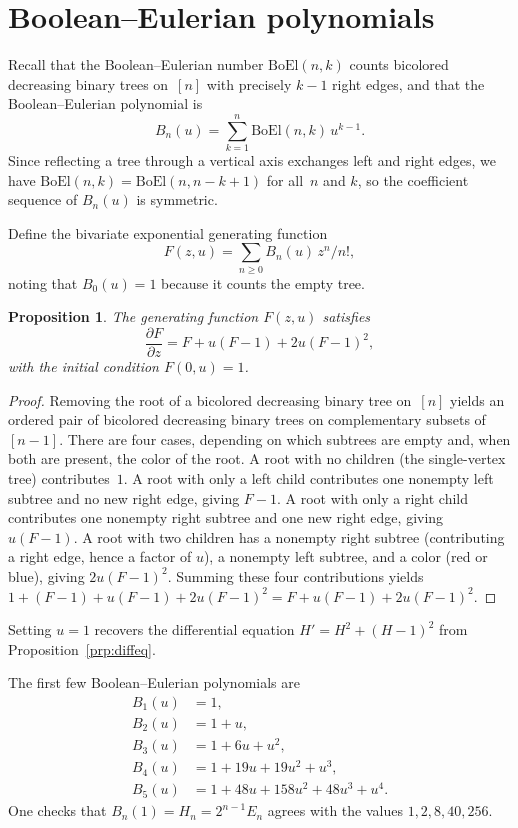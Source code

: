 \documentclass[10pt]{article}
\theoremstyle{plain}
\newtheorem{proposition}[theorem]{Proposition}
\newcommand{\boel}{\mathrm{BoEl}}
\begin{document}
\section{Boolean--Eulerian polynomials}
\label{sec:polynomials}

Recall that the Boolean--Eulerian number $\boel(n,k)$ counts bicolored decreasing binary trees on~$[n]$ with precisely $k-1$ right edges, and that the Boolean--Eulerian polynomial is
\[
	B_n(u) = \sum_{k=1}^{n} \boel(n,k)\, u^{k-1}.
\]
Since reflecting a tree through a vertical axis exchanges left and right edges, we have $\boel(n,k) = \boel(n,n-k+1)$ for all~$n$ and $k$, so the coefficient sequence of $B_n(u)$ is symmetric.

Define the bivariate exponential generating function
\[
	F(z,u) = \sum_{n \geq 0} B_n(u)\, z^n/n!,
\]
noting that $B_0(u) = 1$ because it counts the empty tree.

\begin{proposition}
\label{prp:bivariate-ode}
The generating function $F(z,u)$ satisfies
\[
	\frac{\partial F}{\partial z} = F + u(F-1) + 2u(F-1)^2,
\]
with the initial condition $F(0,u) = 1$.
\end{proposition}

\begin{proof}
Removing the root of a bicolored decreasing binary tree on~$[n]$ yields an ordered pair of bicolored decreasing binary trees on complementary subsets of $[n-1]$. There are four cases, depending on which subtrees are empty and, when both are present, the color of the root. A root with no children (the single-vertex tree) contributes~$1$. A root with only a left child contributes one nonempty left subtree and no new right edge, giving $F - 1$. A root with only a right child contributes one nonempty right subtree and one new right edge, giving $u(F-1)$. A root with two children has a nonempty right subtree (contributing a right edge, hence a factor of $u$), a nonempty left subtree, and a color (red or blue), giving $2u(F-1)^2$. Summing these four contributions yields $1 + (F-1) + u(F-1) + 2u(F-1)^2 = F + u(F-1) + 2u(F-1)^2$.
\end{proof}

Setting $u = 1$ recovers the differential equation $H' = H^2 + (H-1)^2$ from Proposition~\ref{prp:diffeq}.

The first few Boolean--Eulerian polynomials are
\begin{align*}
	B_1(u) &= 1, \\
	B_2(u) &= 1 + u, \\
	B_3(u) &= 1 + 6u + u^2, \\
	B_4(u) &= 1 + 19u + 19u^2 + u^3, \\
	B_5(u) &= 1 + 48u + 158u^2 + 48u^3 + u^4.
\end{align*}
One checks that $B_n(1) = H_n = 2^{n-1} E_n$ agrees with the values $1, 2, 8, 40, 256$.
\end{document}
